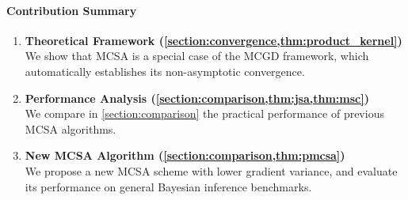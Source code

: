 \paragraph{Contribution Summary}
\begin{enumerate}[leftmargin=5mm,listparindent=\parindent]
\vspace{-0.05in}
\item \textbf{Theoretical Framework (\cref{section:convergence,thm:product_kernel})} \\
  We show that MCSA is a special case of the MCGD framework, which automatically establishes its non-asymptotic convergence.
\item \textbf{Performance Analysis (\cref{section:comparison,thm:jsa,thm:msc})} \\
  We compare in \cref{section:comparison} the practical performance of previous MCSA algorithms.
\item \textbf{New MCSA Algorithm (\cref{section:comparison,thm:pmcsa})} \\
  We propose a new MCSA scheme with lower gradient variance, and evaluate its performance on general Bayesian inference benchmarks.
\end{enumerate}

